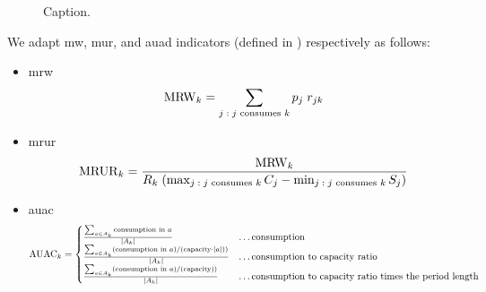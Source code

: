 \begin{itemize}
\begin{figure}[t]
      \caption{Caption.}
      \label{fig:MachineLoad}
    \end{figure}

    We adapt \ac{mw}, \ac{mur}, and \ac{auad} indicators (defined in ) respectively as follows:
    \begin{itemize}
        \item \ac{mrw}
        $$
        \operatorname{MRW}_{k} = \sum_{\substack{j \;:\; \text{$j$ consumes $k$}}} p_j \; r_{jk}
        $$

        \item \ac{mrur}
        $$
        \operatorname{MRUR}_{k} = \frac{\operatorname{MRW}_{k}}{R_k \; (\max_{j \;:\; \text{$j$ consumes $k$}} C_j - \min_{j \;:\; \text{$j$ consumes $k$}} S_j)}
        $$

        \item \ac{auac} 
        $$
        \operatorname{AUAC}_{k} = \begin{cases}
            \frac{\sum_{a \in A_k} \text{consumption in $a$}}{\left|{A_k}\right|} & \dots \text{consumption} \\
            \frac{\sum_{a \in A_k} (\text{consumption in $a$}) / (\text{capacity} \cdot \left|{a}\right|))}{\left|{A_k}\right|} & \dots \text{consumption to capacity ratio} \\
            \frac{\sum_{a \in A_k} (\text{consumption in $a$}) / (\text{capacity}))}{\left|{A_k}\right|} & \dots \text{consumption to capacity ratio times the period length}
            \end{cases}
        $$
    \end{itemize}


\end{itemize}
